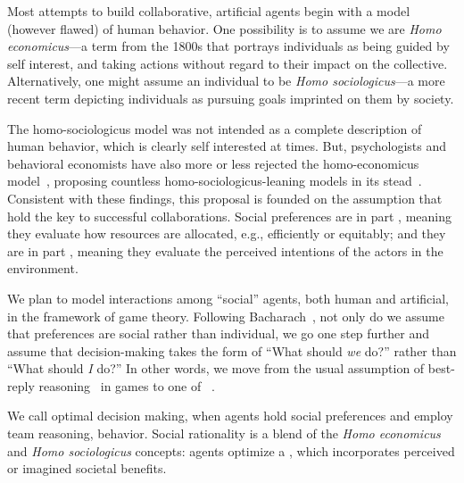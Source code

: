 Most attempts to build collaborative, artificial agents begin with a
model (however flawed) of human behavior.
%
One possibility is to assume we are \emph{Homo economicus}---a term
from the 1800s that portrays individuals as being guided by self interest,
and taking actions without regard to their impact on the collective.
Alternatively, one might assume an individual to be \emph{Homo
  sociologicus}---a more recent term depicting individuals as pursuing
goals imprinted on them by society.

The homo-sociologicus model was not intended as a complete description
of human behavior, which is clearly self interested at times.  But,
psychologists and behavioral economists have also more or less
rejected the homo-economicus model~\cite{Kahnemann, etc.}, proposing
countless homo-sociologicus-leaning models in its stead~\cite{ADD
  CITATIONS}.
%
Consistent with these findings, this proposal is founded on the
assumption that 
 hold the key to successful collaborations.
%
Social preferences are in part , meaning they
evaluate how resources are allocated, e.g., efficiently or equitably;
and they are in part , meaning they evaluate the
perceived intentions of the actors in the environment.

We plan to model interactions among ``social'' agents, both human and
artificial, in the framework of game theory.  
%
Following Bacharach~\cite{2006}, not only do we assume that
preferences are social rather than individual, we go one step further
and assume that decision-making takes the form of ``What should
\emph{we\/} do?'' rather than ``What should \emph{I\/} do?''  In other
words, we move from the usual assumption of best-reply
reasoning~\cite{Cournot} in games to one of ~\cite{TEAM REASONING: Bacharach 1999}.

We call optimal decision making, when agents hold
social preferences and employ team reasoning,  behavior.  Social rationality is a blend of the \emph{Homo
  economicus\/} and \emph{Homo sociologicus\/} concepts: agents
optimize a , which incorporates
perceived or imagined societal benefits.

